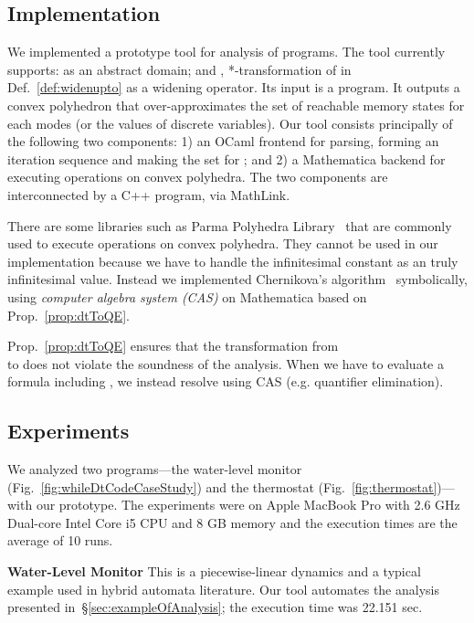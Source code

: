 \documentclass[envcountsect,orivec]{llncs} \pdfoutput=1
\theoremstyle{definition}
\begin{document}
\subsection{Implementation}
We implemented a prototype tool for analysis of  programs.
The tool currently supports:  as an abstract domain; and
, *-transformation of  in Def.~\ref{def:widenupto} as a widening operator.
Its input is a  program.
It outputs a convex polyhedron that over-approximates the set of reachable memory states for each modes (or the values of discrete variables).
Our tool consists principally of the following two components:
1) an OCaml frontend for parsing, forming an iteration sequence and making the set  for ; and
2) a Mathematica backend for executing operations on convex polyhedra.
The two components are interconnected by a C++ program, via MathLink.

There are some libraries such as Parma Polyhedra Library~\cite{BagnaraHZ08SCP} that are commonly used to execute operations on convex polyhedra.
They cannot be used in our implementation because we have to handle the infinitesimal constant  as an truly infinitesimal value.
Instead we implemented Chernikova's algorithm~\cite{Chernikova1964, Chernikova1965, Chernikova1968, LeVerge1992} symbolically, using \emph{computer algebra system (CAS)} on Mathematica based on Prop.~\ref{prop:dtToQE}.

Prop.~\ref{prop:dtToQE} ensures that the transformation from  \\to
 does not violate the soundness of the analysis.
When we have to evaluate a formula including , we instead resolve  using CAS (e.g. quantifier elimination).





\subsection{Experiments}\label{subsec:experiments}
We analyzed two  programs---the water-level monitor (Fig.~\ref{fig:whileDtCodeCaseStudy}) and the thermostat
(Fig.~\ref{fig:thermostat})---with our prototype.
The experiments were on Apple MacBook Pro with 2.6 GHz Dual-core Intel Core i5 CPU and 8 GB memory and the execution times are the average of 10 runs.

\noindent
\textbf{Water-Level Monitor} 
This is a piecewise-linear dynamics
and a typical example used in hybrid automata literature. Our tool
automates the analysis presented in~\S{}\ref{sec:exampleOfAnalysis};
the execution time was 22.151 sec.
\end{document}
